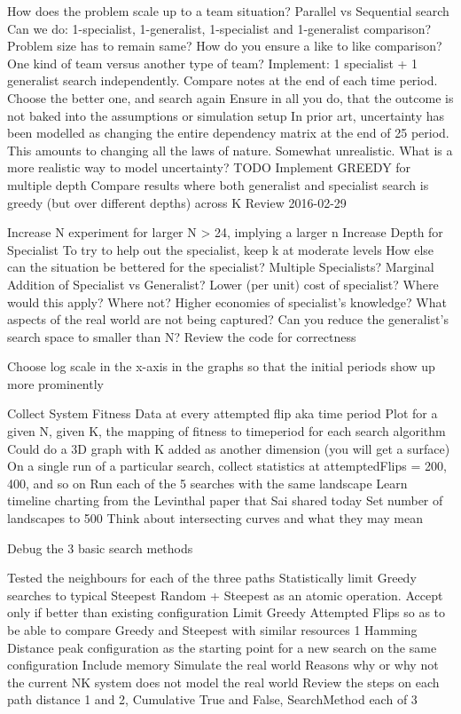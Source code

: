 \documentclass[12pt]{article}
\begin{document}
 How does the problem scale up to a team situation? Parallel vs Sequential search
 Can we do: 1-specialist, 1-generalist, 1-specialist and 1-generalist comparison? Problem size has to remain same? How do you ensure a like to like comparison? One kind of team versus another type of team?
 Implement: 1 specialist + 1 generalist search independently. Compare notes at the end of each time period. Choose the better one, and search again
 Ensure in all you do, that the outcome is not baked into the assumptions or simulation setup
 In prior art, uncertainty has been modelled as changing the entire dependency matrix at the end of 25 period. This amounts to changing all the laws of nature. Somewhat unrealistic. What is a more realistic way to model uncertainty?
 TODO Implement GREEDY for multiple depth
 Compare results where both generalist and specialist search is greedy (but over different depths) across K
 Review \cite{Knudsen2014} \cite{Melero2015} \cite{Almirall2010}
2016-02-29

 Increase N experiment for larger N > 24, implying a larger n
 Increase Depth for Specialist
 To try to help out the specialist, keep k at moderate levels
 How else can the situation be bettered for the specialist?
 Multiple Specialists? Marginal Addition of Specialist vs Generalist?
 Lower (per unit) cost of specialist? Where would this apply? Where not? Higher economies of specialist's knowledge?
 What aspects of the real world are not being captured?
 Can you reduce the generalist's search space to smaller than N?
 Review the code for correctness

 Choose log scale in the x-axis in the graphs so that the initial periods show up more prominently

 Collect System Fitness Data at every attempted flip aka time period
 Plot for a given N, given K, the mapping of fitness to timeperiod for each search algorithm
 Could do a 3D graph with K added as another dimension (you will get a surface)
 On a single run of a particular search, collect statistics at attemptedFlips = 200, 400, and so on
 Run each of the 5 searches with the same landscape
 Learn timeline charting from the Levinthal paper that Sai shared today
 Set number of landscapes to 500
 Think about intersecting curves and what they may mean

 Debug the 3 basic search methods

 Tested the neighbours for each of the three paths
 Statistically limit Greedy searches to typical Steepest
 Random + Steepest as an atomic operation. Accept only if better than existing configuration
 Limit Greedy Attempted Flips so as to be able to compare Greedy and Steepest with similar resources
 1 Hamming Distance peak configuration as the starting point for a new search on the same configuration
 Include memory
 Simulate the real world
 Reasons why or why not the current NK system does not model the real world
 Review the steps on each path distance 1 and 2, Cumulative True and False, SearchMethod each of 3
\end{document}
